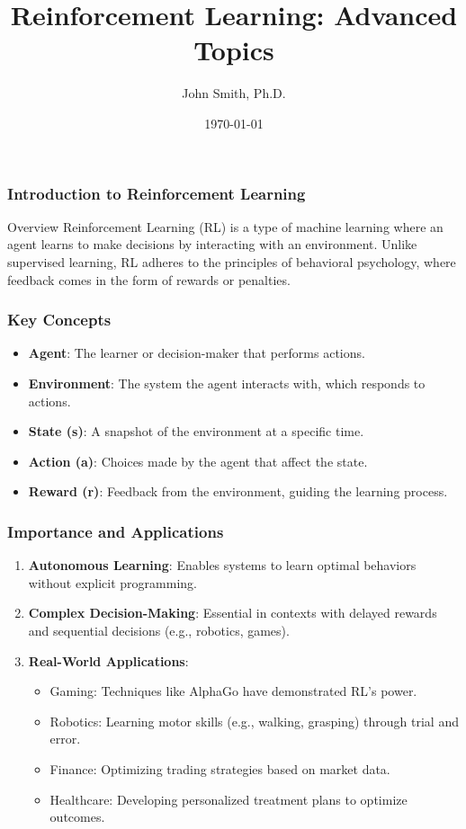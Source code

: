 \documentclass[aspectratio=169]{beamer}
\title[Reinforcement Learning: Advanced Topics]{Reinforcement Learning: Advanced Topics}
\author[J. Smith]{John Smith, Ph.D.}
\institute[University Name]{
  Department of Computer Science\\
  University Name\\
  \vspace{0.3cm}
  Email: email@university.edu\\
  Website: www.university.edu
}
\date{\today}
\begin{document}
\frame{\titlepage}

\begin{frame}[fragile]
    \frametitle{Introduction to Reinforcement Learning}
    \begin{block}{Overview}
        Reinforcement Learning (RL) is a type of machine learning where an agent learns to make decisions by interacting with an environment. Unlike supervised learning, RL adheres to the principles of behavioral psychology, where feedback comes in the form of rewards or penalties.
    \end{block}
\end{frame}

\begin{frame}[fragile]
    \frametitle{Key Concepts}
    \begin{itemize}
        \item \textbf{Agent}: The learner or decision-maker that performs actions.
        \item \textbf{Environment}: The system the agent interacts with, which responds to actions.
        \item \textbf{State (s)}: A snapshot of the environment at a specific time.
        \item \textbf{Action (a)}: Choices made by the agent that affect the state.
        \item \textbf{Reward (r)}: Feedback from the environment, guiding the learning process.
    \end{itemize}
\end{frame}

\begin{frame}[fragile]
    \frametitle{Importance and Applications}
    \begin{enumerate}
        \item \textbf{Autonomous Learning}: Enables systems to learn optimal behaviors without explicit programming.
        \item \textbf{Complex Decision-Making}: Essential in contexts with delayed rewards and sequential decisions (e.g., robotics, games).
        \item \textbf{Real-World Applications}:
        \begin{itemize}
            \item Gaming: Techniques like AlphaGo have demonstrated RL's power.
            \item Robotics: Learning motor skills (e.g., walking, grasping) through trial and error.
            \item Finance: Optimizing trading strategies based on market data.
            \item Healthcare: Developing personalized treatment plans to optimize outcomes.
        \end{itemize}
    \end{enumerate}
\end{frame}
\end{document}
